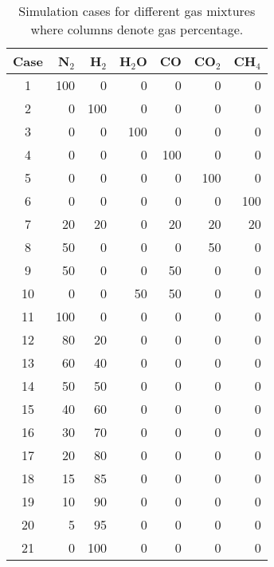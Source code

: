 \begin{table}[H]
    \centering
    \caption{Simulation cases for different gas mixtures where columns denote gas percentage.}
    \begin{tabular}{crrrrrr}
        \hline
        Case    & N$_2$ & H$_2$     & H$_2$O    & CO    & CO$_2$    & CH$_4$    \\
        \hline
        1       & 100   & 0         & 0         & 0     & 0         & 0         \\
        2       & 0     & 100       & 0         & 0     & 0         & 0         \\
        3       & 0     & 0         & 100       & 0     & 0         & 0         \\
        4       & 0     & 0         & 0         & 100   & 0         & 0         \\
        5       & 0     & 0         & 0         & 0     & 100       & 0         \\
        6       & 0     & 0         & 0         & 0     & 0         & 100       \\
        7       & 20    & 20        & 0         & 20    & 20        & 20        \\
        8       & 50    & 0         & 0         & 0     & 50        & 0         \\
        9       & 50    & 0         & 0         & 50    & 0         & 0         \\
        10      & 0     & 0         & 50        & 50    & 0         & 0         \\
        11      & 100   & 0         & 0         & 0     & 0         & 0         \\
        12      & 80    & 20        & 0         & 0     & 0         & 0         \\
        13      & 60    & 40        & 0         & 0     & 0         & 0         \\
        14      & 50    & 50        & 0         & 0     & 0         & 0         \\
        15      & 40    & 60        & 0         & 0     & 0         & 0         \\
        16      & 30    & 70        & 0         & 0     & 0         & 0         \\
        17      & 20    & 80        & 0         & 0     & 0         & 0         \\
        18      & 15    & 85        & 0         & 0     & 0         & 0         \\
        19      & 10    & 90        & 0         & 0     & 0         & 0         \\
        20      & 5     & 95        & 0         & 0     & 0         & 0         \\
        21      & 0     & 100       & 0         & 0     & 0         & 0         \\
        \hline
    \end{tabular}
    \label{tab:cases}
\end{table}
